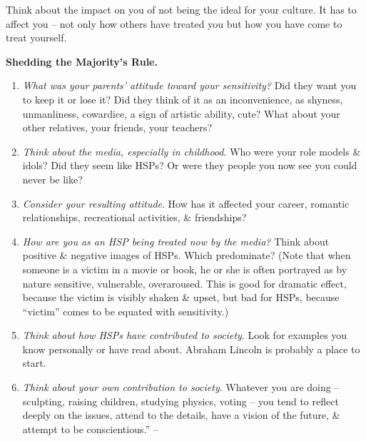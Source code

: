 \documentclass{article}
\numberwithin{equation}{section}
\begin{document}
Think about the impact on you of not being the ideal for your culture. It has to affect you -- not only how others have treated you but how you have come to treat yourself.

\textbf{Shedding the Majority's Rule.}
\begin{enumerate}
	\item \textit{What was your parents' attitude toward your sensitivity?} Did they want you to keep it or lose it? Did they think of it as an inconvenience, as shyness, unmanliness, cowardice, a sign of artistic ability, cute? What about your other relatives, your friends, your teachers?
	\item \textit{Think about the media, especially in childhood}. Who were your role models \& idols? Did they seem like HSPs? Or were they people you now see you could never be like?
	\item \textit{Consider your resulting attitude}. How has it affected your career, romantic relationships, recreational activities, \& friendships?
	\item \textit{How are you as an HSP being treated now by the media?} Think about positive \& negative images of HSPs. Which predominate? (Note that when someone is a victim in a movie or book, he or she is often portrayed as by nature sensitive, vulnerable, overaroused. This is good for dramatic effect, because the victim is visibly shaken \& upset, but bad for HSPs, because ``victim'' comes to be equated with sensitivity.)
	\item \textit{Think about how HSPs have contributed to society}. Look for examples you know personally or have read about. Abraham Lincoln is probably a place to start.
	\item \textit{Think about your own contribution to society}. Whatever you are doing -- sculpting, raising children, studying physics, voting -- you tend to reflect deeply on the issues, attend to the details, have a vision of the future, \& attempt to be conscientious.'' -- \cite[pp. 47--50]{Aron2013}
\end{enumerate}
\end{document}
